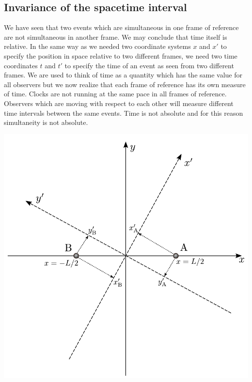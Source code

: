 {\begin{multicols}{2}
 

\section{Invariance of the spacetime interval}
\label{sect:invariance}

We have seen that two events which are simultaneous in one frame of reference are not simultaneous in another frame. We may conclude that time itself is relative. In the same way as we needed two coordinate systems $x$ and $x'$ to specify the position in space relative to two different frames, we need two time coordinates $t$ and $t'$ to specify the time of an event as seen from two different frames. We are used to think of time as a quantity which has the same value for all observers but we now realize that each frame of reference has its own measure of time. Clocks are not running at the same pace in all frames of reference. Observers which are moving with respect to each other will measure different time intervals between the same events. Time is not absolute and for this reason simultaneity is not absolute.

\begin{Figure}%
\centering
\includegraphics[width=\textwidth]{fig_7-5.pdf}
\end{Figure}


\end{multicols}}
